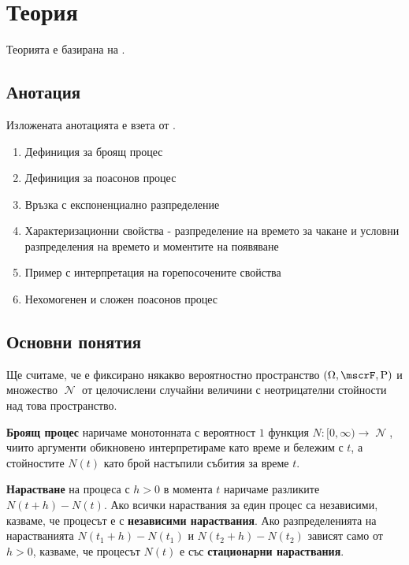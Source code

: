 \documentclass{../../common/topic}
\begin{document}
\maketitle

\section{Теория}

Теорията е базирана на \cite{Божкова2012Лекции}.

\subsection{Анотация}

Изложената анотацията е взета от \cite{Syllabus}.

\begin{enumerate}
  \item Дефиниция за броящ процес
  \item Дефиниция за поасонов процес
  \item Връзка с експоненциално разпределение
  \item Характеризационни свойства - разпределение на времето за чакане и условни разпределения на времето и моментите на появяване
  \item Пример с интерпретация на горепосочените свойства
  \item Нехомогенен и сложен поасонов процес
\end{enumerate}

\subsection{Основни понятия}

Ще считаме, че е фиксирано някакво вероятностно пространство \( (\Omega, \mscrF, \Prob) \) и множество \( \mscrN \) от целочислени случайни величини с неотрицателни стойности над това пространство.

\makeatletter
\setcounter{counters@theorem}{-1}
\makeatother
\begin{definition}
  \textbf{Броящ процес} наричаме монотонната с вероятност \( 1 \) функция \( N: [0, \infty) \to \mscrN \), чиито аргументи обикновено интерпретираме като време и бележим с \( t \), а стойностите \( N(t) \) като брой настъпили събития за време \( t \).

  \textbf{Нарастване} на процеса с \( h > 0 \) в момента \( t \) наричаме разликите \( N(t+h) - N(t) \). Ако всички нараствания за един процес са независими, казваме, че процесът е с \textbf{независими нараствания}. Ако разпределенията на нарастванията \( N(t_1+h) - N(t_1) \) и \( N(t_2+h) - N(t_2) \) зависят само от \( h>0 \), казваме, че процесът \( N(t) \) е със \textbf{стационарни нараствания}.
\end{definition}
\end{document}
